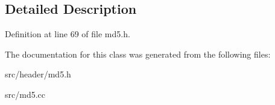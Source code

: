 \subsection{Detailed Description}


Definition at line 69 of file md5.\-h.



The documentation for this class was generated from the following files\-:\begin{DoxyCompactItemize}
\item 
src/header/md5.\-h\item 
src/md5.\-cc\end{DoxyCompactItemize}
